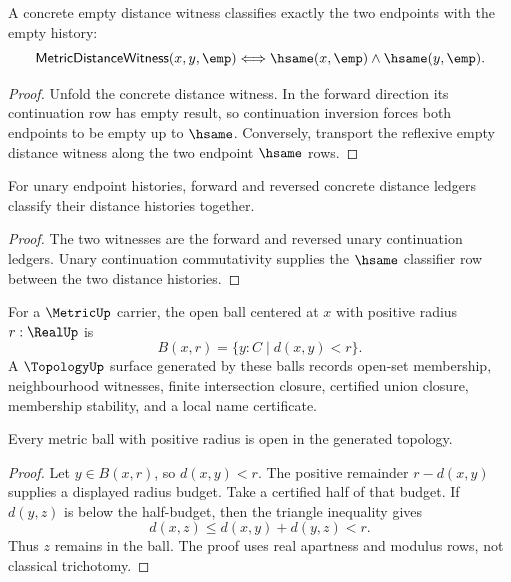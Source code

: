 \begin{theorem}
\label{thm:countable-completion-metric-empty-distance}
A concrete empty distance witness classifies exactly the two endpoints with
the empty history:
$$
\mathsf{MetricDistanceWitness}(x,y,\emp)
\Longleftrightarrow
\hsame(x,\emp)\wedge\hsame(y,\emp).
$$
\end{theorem}

\begin{proof}
Unfold the concrete distance witness.  In the forward direction its
continuation row has empty result, so continuation inversion forces both
endpoints to be empty up to $\hsame$.  Conversely, transport the reflexive
empty distance witness along the two endpoint $\hsame$ rows.
\end{proof}

\begin{theorem}
\label{thm:countable-completion-metric-symmetry-ledger}
For unary endpoint histories, forward and reversed concrete distance ledgers
classify their distance histories together.
\end{theorem}

\begin{proof}
The two witnesses are the forward and reversed unary continuation ledgers.
Unary continuation commutativity supplies the $\hsame$ classifier row between
the two distance histories.
\end{proof}

\begin{definition}
\label{def:countable-completion-metric-topology}
For a $\MetricUp$ carrier, the open ball centered at $x$ with positive radius
$r:\RealUp$ is
$$
B(x,r)=\{y:C\mid d(x,y)<r\}.
$$
A $\TopologyUp$ surface generated by these balls records open-set membership,
neighbourhood witnesses, finite intersection closure, certified union
closure, membership stability, and a local name certificate.
\end{definition}

\begin{theorem}
\label{thm:countable-completion-metric-balls-open}
Every metric ball with positive radius is open in the generated topology.
\end{theorem}

\begin{proof}
Let $y\in B(x,r)$, so $d(x,y)<r$.  The positive remainder
$r-d(x,y)$ supplies a displayed radius budget.  Take a certified half of that
budget.  If $d(y,z)$ is below the half-budget, then the triangle inequality
gives
$$
d(x,z)\le d(x,y)+d(y,z)<r.
$$
Thus $z$ remains in the ball.  The proof uses real apartness and modulus
rows, not classical trichotomy.
\end{proof}

